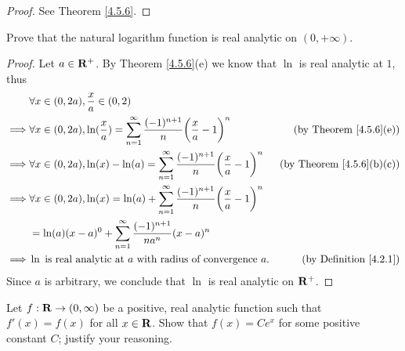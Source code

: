 \begin{proof}
    See Theorem \ref{4.5.6}.
\end{proof}

\begin{exercise}\label{ex 4.5.6}
    Prove that the natural logarithm function is real analytic on \((0, +\infty)\).
\end{exercise}

\begin{proof}
    Let \(a \in \mathbf{R}^+\).
    By Theorem \ref{4.5.6}(e) we know that \(\ln\) is real analytic at \(1\), thus
    \begin{align*}
                 & \forall x \in (0, 2a), \frac{x}{a} \in (0, 2)                                                                                                              \\
        \implies & \forall x \in (0, 2a), \ln(\frac{x}{a}) = \sum_{n = 1}^\infty \frac{(-1)^{n + 1}}{n} \bigg(\frac{x}{a} - 1\bigg)^n & \text{(by Theorem \ref{4.5.6}(e))}    \\
        \implies & \forall x \in (0, 2a), \ln(x) - \ln(a) = \sum_{n = 1}^\infty \frac{(-1)^{n + 1}}{n} \bigg(\frac{x}{a} - 1\bigg)^n  & \text{(by Theorem \ref{4.5.6}(b)(c))} \\
        \implies & \forall x \in (0, 2a), \ln(x) = \ln(a) + \sum_{n = 1}^\infty \frac{(-1)^{n + 1}}{n} \bigg(\frac{x}{a} - 1\bigg)^n                                          \\
                 & = \ln(a) (x - a)^0 + \sum_{n = 1}^\infty \frac{(-1)^{n + 1}}{n a^n} (x - a)^n                                                                              \\
        \implies & \ln \text{ is real analytic at } a \text{ with radius of convergence } a.                                          & \text{(by Definition \ref{4.2.1})}
    \end{align*}
    Since \(a\) is arbitrary, we conclude that \(\ln\) is real analytic on \(\mathbf{R}^+\).
\end{proof}

\begin{exercise}\label{ex 4.5.7}
    Let \(f : \mathbf{R} \to (0, \infty)\) be a positive, real analytic function such that \(f'(x) = f(x)\) for all \(x \in \mathbf{R}\).
    Show that \(f(x) = C e^x\) for some positive constant \(C\);
    justify your reasoning.
\end{exercise}

